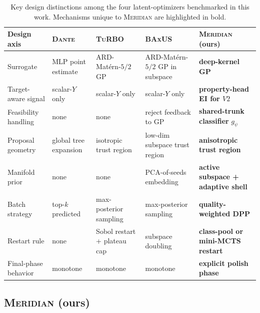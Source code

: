 \documentclass{article}
\newcommand{\meridian}{\textsc{Meridian}}
\newcommand{\dante}{\textsc{Dante}}
\newcommand{\turbo}{\textsc{TuRBO}}
\newcommand{\baxus}{\textsc{BAxUS}}
\begin{document}
\begin{table}[!ht]
  \caption{Key design distinctions among the four latent-optimizers benchmarked in this work. Mechanisms unique to \meridian{} are highlighted in bold.}
  \label{tab:opt-comparison}
  \centering
  \small
  \setlength{\tabcolsep}{4pt}
  \begin{tabularx}{\linewidth}{l XXXX}
    \toprule
    Design axis & \dante{}~\citep{wei2025} & \turbo{}~\citep{eriksson2019} & \baxus{}~\citep{papenmeier2022} & \meridian{} (ours) \\
    \midrule
    Surrogate
      & MLP point estimate
      & ARD-Mat\'ern-$5/2$ GP
      & ARD-Mat\'ern-$5/2$ GP in subspace
      & \textbf{deep-kernel GP} \\
    Target-aware signal
      & scalar-$Y$ only
      & scalar-$Y$ only
      & scalar-$Y$ only
      & \textbf{property-head EI for $V2$} \\
    Feasibility handling
      & none
      & none
      & reject feedback to GP
      & \textbf{shared-trunk classifier} $g_\psi$ \\
    Proposal geometry
      & global tree expansion
      & isotropic trust region
      & low-dim subspace trust region
      & \textbf{anisotropic trust region} \\
    Manifold prior
      & none
      & none
      & PCA-of-seeds embedding
      & \textbf{active subspace + adaptive shell} \\
    Batch strategy
      & top-$k$ predicted
      & max-posterior sampling
      & max-posterior sampling
      & \textbf{quality-weighted DPP} \\
    Restart rule
      & none
      & Sobol restart + plateau cap
      & subspace doubling
      & \textbf{class-pool or mini-MCTS restart} \\
    Final-phase behavior
      & monotone
      & monotone
      & monotone
      & \textbf{explicit polish phase} \\
    \bottomrule
  \end{tabularx}
\end{table}


\subsection{\meridian{} (ours)}
\label{app:meridian-details}
\end{document}
